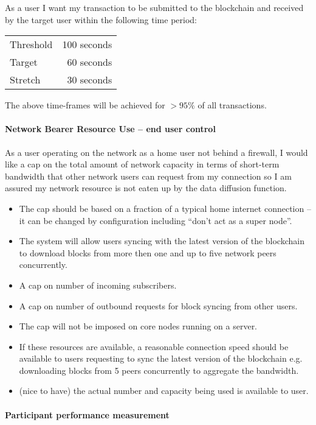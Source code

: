 \documentclass{report}
\theoremstyle{definition}{
  \newtheorem{lemma}{Lemma}[section] %
  \newtheorem{definition}[lemma]{Definition}
}
\theoremstyle{theorem}{
  \newtheorem{invariant}[lemma]{Invariant}
  \newtheorem{proofobligation}[lemma]{Proof Obligation}
}
\numberwithin{equation}{lemma}
\begin{document}
As a user I want my transaction to be submitted to the blockchain and received
by the target user within the following time period:
%
\begin{center}
\begin{tabular}{lr}
Threshold & 100 seconds \\
Target    & 60 seconds  \\
Stretch   & 30 seconds  \\
\end{tabular}
\end{center}
%
The above time-frames will be achieved for $>95\%$ of all transactions.

\paragraph{Network Bearer Resource Use -- end user control}

As a user operating on the network as a home user not behind a firewall, I
would like a cap on the total amount of network capacity in terms of short-term
bandwidth that other network users can request from my connection so I am
assured my network resource is not eaten up by the data diffusion function.

\begin{itemize}
\item The cap should be based on a fraction of a typical home internet
      connection -- it can be changed by configuration including ``don't act
      as a super node''.
\item The system will allow users syncing with the latest version of the
      blockchain to download blocks from more then one and up to five network
      peers concurrently.
\item A cap on number of incoming subscribers.
\item A cap on number of outbound requests for block syncing from other users.
\item The cap will not be imposed on core nodes running on a server.
\item If these resources are available, a reasonable connection speed should be
      available to users requesting to sync the latest version of the
      blockchain e.g. downloading blocks from 5 peers concurrently to aggregate
      the bandwidth.
\item (nice to have) the actual number and capacity being used is available to
      user.
\end{itemize}

\paragraph{Participant performance measurement}
\end{document}
